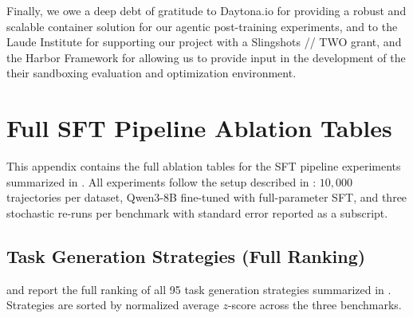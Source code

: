 \documentclass{llmxive}
\begin{document}
\begin{ack}
Finally, we owe a deep debt of gratitude to Daytona.io for providing a robust and scalable container solution for our agentic post-training experiments, and to the Laude Institute for supporting our project with a Slingshots // TWO grant, and the Harbor Framework for allowing us to provide input in the development of the their sandboxing evaluation and optimization environment.
\end{ack}






\appendix




\startcontents[sections]



\section{Full SFT Pipeline Ablation Tables}
\label{app:sft-ablations-full}

This appendix contains the full ablation tables for the SFT pipeline experiments summarized in . All experiments follow the setup described in : $10{,}000$ trajectories per dataset, Qwen3-8B fine-tuned with full-parameter SFT, and three stochastic re-runs per benchmark with standard error reported as a subscript.

\subsection{Task Generation Strategies (Full Ranking)}
\label{app:task-gen-full}

 and  report the full ranking of all 95 task generation strategies summarized in . Strategies are sorted by normalized average $z$-score across the three benchmarks.
\end{document}
